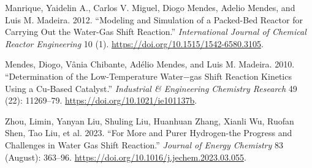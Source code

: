 \documentclass[
  12pt,
  a4paperpaper,
  DIV=11,
  numbers=noendperiod]{scrartcl}
\newlength{\cslhangindent}
\newenvironment{CSLReferences}[2] %
 {\begin{list}{}{%
  \setlength{\itemindent}{0pt}
  \setlength{\leftmargin}{0pt}
  \setlength{\parsep}{0pt}
  \ifodd #1
   \setlength{\leftmargin}{\cslhangindent}
   \setlength{\itemindent}{-1\cslhangindent}
  \fi
  \setlength{\itemsep}{#2\baselineskip}}}
 {\end{list}}
\begin{document}
\label{refs}
\begin{CSLReferences}{1}{0}
Manrique, Yaidelin A., Carlos V. Miguel, Diogo Mendes, Adelio Mendes,
and Luis M. Madeira. 2012. {``Modeling and Simulation of a Packed-Bed
Reactor for Carrying Out the Water-Gas Shift Reaction.''}
\emph{International Journal of Chemical Reactor Engineering} 10 (1).
\url{https://doi.org/10.1515/1542-6580.3105}.

Mendes, Diogo, Vânia Chibante, Adélio Mendes, and Luis M. Madeira. 2010.
{``Determination of the Low-Temperature Water−gas Shift Reaction
Kinetics Using a Cu-Based Catalyst.''} \emph{Industrial \& Engineering
Chemistry Research} 49 (22): 11269--79.
\url{https://doi.org/10.1021/ie101137b}.

Zhou, Limin, Yanyan Liu, Shuling Liu, Huanhuan Zhang, Xianli Wu, Ruofan
Shen, Tao Liu, et al. 2023. {``For More and Purer Hydrogen-the Progress
and Challenges in Water Gas Shift Reaction.''} \emph{Journal of Energy
Chemistry} 83 (August): 363--96.
\url{https://doi.org/10.1016/j.jechem.2023.03.055}.

\end{CSLReferences}
\end{document}
